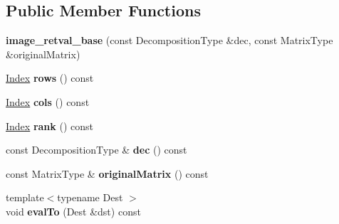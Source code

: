 \subsection*{Public Member Functions}
\begin{DoxyCompactItemize}
\item 
\mbox{\label{struct_eigen_1_1internal_1_1image__retval__base_a72c098f98f6702852f8341ee2406585f}} 
{\bfseries image\+\_\+retval\+\_\+base} (const Decomposition\+Type \&dec, const Matrix\+Type \&original\+Matrix)
\item 
\mbox{\label{struct_eigen_1_1internal_1_1image__retval__base_a37453f1615e91001e4e838293144c63f}} 
\hyperlink{namespace_eigen_a62e77e0933482dafde8fe197d9a2cfde}{Index} {\bfseries rows} () const
\item 
\mbox{\label{struct_eigen_1_1internal_1_1image__retval__base_a2f602147609d036b62b84c4257635abb}} 
\hyperlink{namespace_eigen_a62e77e0933482dafde8fe197d9a2cfde}{Index} {\bfseries cols} () const
\item 
\mbox{\label{struct_eigen_1_1internal_1_1image__retval__base_a13926ab4b6107eb6e8e6759a04c7406b}} 
\hyperlink{namespace_eigen_a62e77e0933482dafde8fe197d9a2cfde}{Index} {\bfseries rank} () const
\item 
\mbox{\label{struct_eigen_1_1internal_1_1image__retval__base_a46691a7d5e03235242acbce16cc0e78a}} 
const Decomposition\+Type \& {\bfseries dec} () const
\item 
\mbox{\label{struct_eigen_1_1internal_1_1image__retval__base_a6b7716d833c63bdd9b9625ee869e93d7}} 
const Matrix\+Type \& {\bfseries original\+Matrix} () const
\item 
\mbox{\label{struct_eigen_1_1internal_1_1image__retval__base_ad324e0d8a20369d3cdf61104227ed230}} 
{\footnotesize template$<$typename Dest $>$ }\\void {\bfseries eval\+To} (Dest \&dst) const
\item 

\end{DoxyCompactItemize}
